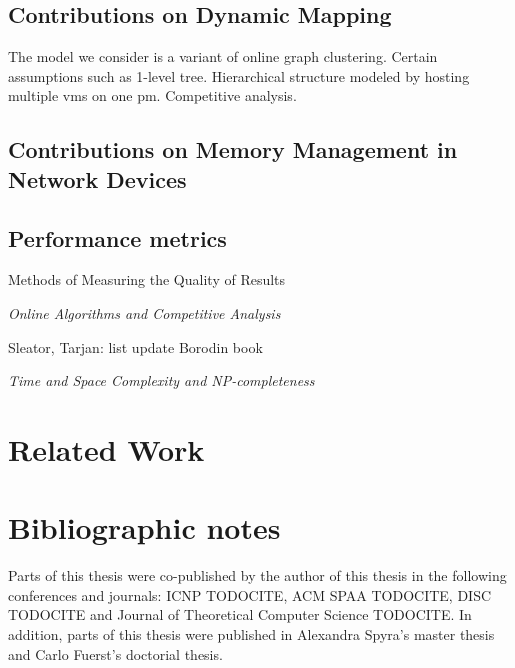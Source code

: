 \subsection{Contributions on Dynamic Mapping}

The model we consider is a variant of online graph clustering.
Certain assumptions such as 1-level tree. Hierarchical structure modeled by hosting multiple vms on one pm.
Competitive analysis.

\subsection{Contributions on Memory Management in Network Devices}


\subsection{Performance metrics}



Methods of Measuring the Quality of Results

\emph{Online Algorithms and Competitive Analysis}

Sleator, Tarjan: list update \cite{competitive-analysis}
Borodin book \cite{borodin-book}

\emph{Time and Space Complexity and NP-completeness}


\section{Related Work}





\section{Bibliographic notes}

Parts of this thesis were co-published by the author of this thesis in the following conferences and journals: ICNP TODOCITE, ACM SPAA TODOCITE, DISC TODOCITE and Journal of Theoretical Computer Science TODOCITE.
In addition, parts of this thesis were published in Alexandra Spyra's master thesis and Carlo Fuerst's doctorial thesis.